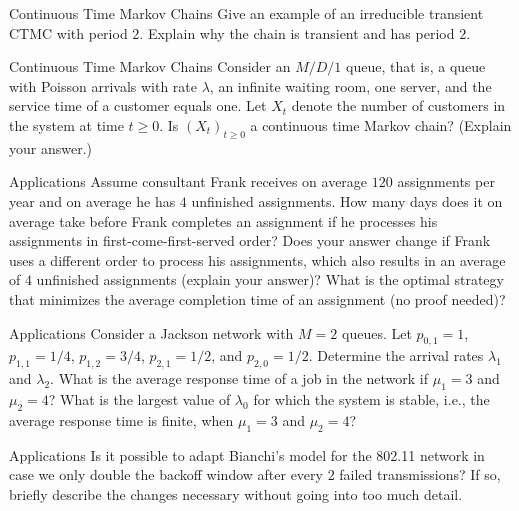 \begin{problem}{Continuous Time Markov Chains}
Give an example of an irreducible transient CTMC with period $2$. Explain why the chain is transient and has period $2$.
\end{problem}

\begin{problem}{Continuous Time Markov Chains}
Consider an $M/D/1$ queue, that is, a queue with Poisson arrivals with rate $\lambda$, an infinite waiting room, one server, and the service time of a customer equals one. Let $X_t$ denote the number of customers in the system at time $t \geq 0$. Is $(X_t)_{t \geq 0}$ a continuous time Markov chain? (Explain your answer.)
\end{problem}

\begin{problem}{Applications}
Assume consultant Frank receives on average $120$ assignments per year and on average he has $4$ unfinished assignments. How many days does it on average take before Frank completes an assignment if he processes his assignments in first-come-first-served order? Does your answer change if Frank uses a different order to process his assignments, which also results in an average of $4$ unfinished assignments (explain your answer)? What is the optimal strategy that minimizes the average completion time of an assignment (no proof needed)?
\end{problem}

\begin{problem}{Applications}
Consider a Jackson network with $M = 2$ queues. Let $p_{0,1} = 1$, $p_{1,1} = 1/4$, $p_{1,2} = 3/4$, $p_{2,1} = 1/2$, and $p_{2,0} = 1/2$. Determine the arrival rates $\lambda_1$ and $\lambda_2$. What is the average response time of a job in the network if $\mu_1 = 3$ and $\mu_2 = 4$? What is the largest value of $\lambda_0$ for which the system is stable, i.e., the average response time is finite, when $\mu_1 = 3$ and $\mu_2 = 4$?
\end{problem}

\begin{problem}{Applications}
Is it possible to adapt Bianchi’s model for the 802.11 network in case we only double the backoff window after every $2$ failed transmissions? If so, briefly describe the changes necessary without going into too much detail.
\end{problem}